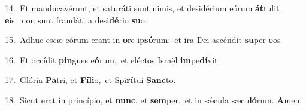 {\numbfont\textcolor{\numbcolor}{14.}}~Et manducavérunt, et saturáti sunt nimis, et desidérium eórum \textbf{át}\-tulit \textbf{e}\-is:~\star non sunt fraudáti a desi\-\textbf{dé}\-rio \textbf{su}\-o.\par
{\numbfont\textcolor{\numbcolor}{15.}}~Adhuc escæ eórum erant in \textbf{o}\-re ip\-\textbf{só}\-rum:~\star et ira Dei ascéndit \textbf{su}\-per \textbf{e}\-os\par
{\numbfont\textcolor{\numbcolor}{16.}}~Et occídit \textbf{pin}\-gues e\-\textbf{ó}\-rum,~\star et eléctos Israël \textbf{im}\-pe\-\textbf{dí}\-vit.\par
{\numbfont\textcolor{\numbcolor}{17.}}~Glória \textbf{Pa}\-tri, et \textbf{Fí}\-\textbf{li}o,~\star et Spi\-\textbf{rí}\-tui \textbf{Sanc}\-to.\par
{\numbfont\textcolor{\numbcolor}{18.}}~Sicut erat in princípio, et \textbf{nunc}\-, et \textbf{sem}\-per,~\star et in sǽcula sæcu\-\textbf{ló}\-rum. \textbf{A}\-men.\par
